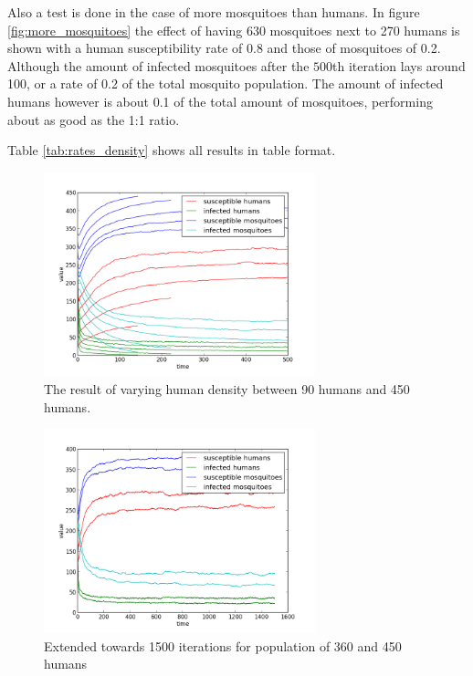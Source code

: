 \documentclass[a4paper]{report}
\begin{document}
Also a test is done in the case of more mosquitoes than humans. In figure
\ref{fig:more_mosquitoes}
the effect of having 630 mosquitoes next to 270 humans is shown with a human
susceptibility rate of 0.8 and those of mosquitoes of 0.2. Although the amount
of infected mosquitoes after the $500$th iteration lays around 100, or a rate
of 0.2 of the total mosquito population. The amount of infected humans however
is about 0.1 of the total amount of mosquitoes, performing about as good as the
1:1 ratio.

Table \ref{tab:rates_density} shows all results in table format.

\begin{figure}[htbp]
    \centering
    \includegraphics[width=0.7\textwidth]{var_human_density_02_05_08.png}
    \caption{The result of varying human density between 90 humans and 450 humans.}
    \label{fig:var_human}
\end{figure}


\begin{figure}[htbp]
    \centering
    \includegraphics[width=0.7\textwidth]{var_human_1500.png}
    \caption{Extended towards 1500 iterations for population of 360 and 450
    humans}
    \label{fig:var_human_1500}
\end{figure}
\end{document}
